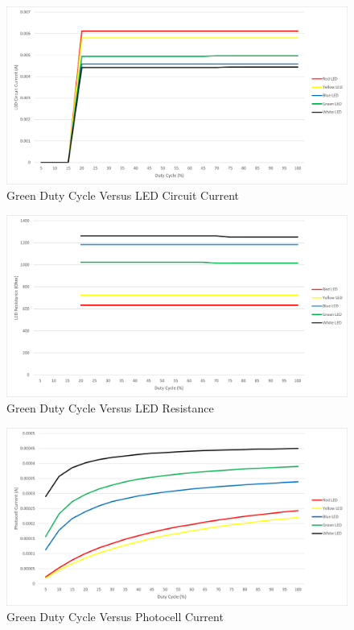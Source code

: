 \documentclass[12pt,titlepage]{article}
\begin{document}
\begin{figure}[!htb]
  \centering
  \includegraphics[width=5in]{lab_4/duty_cycle_led_circuit_curr.png}
  \caption{Green Duty Cycle Versus LED Circuit Current}
\end{figure}
\begin{figure}[!htb]
  \centering
  \includegraphics[width=5in]{lab_4/duty_cycle_led_res.png}
  \caption{Green Duty Cycle Versus LED Resistance}
\end{figure}
\begin{figure}[!htb]
  \centering
  \includegraphics[width=5in]{lab_4/duty_cycle_photo_curr.png}
  \caption{Green Duty Cycle Versus Photocell Current}
\end{figure}
\end{document}
